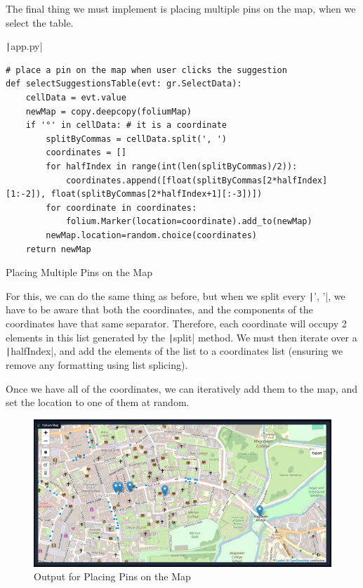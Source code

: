 \documentclass[12pt]{report}
\newcommand{\pil}[1]{\protect\texttt|#1|}
\begin{document}
The final thing we must implement is placing multiple pins on the map, when we select the table.

\begin{listing}[H]
\pil{app.py}
\begin{verbatim}
# place a pin on the map when user clicks the suggestion
def selectSuggestionsTable(evt: gr.SelectData):
    cellData = evt.value
    newMap = copy.deepcopy(foliumMap)
    if '°' in cellData: # it is a coordinate
        splitByCommas = cellData.split(', ')
        coordinates = []
        for halfIndex in range(int(len(splitByCommas)/2)):
            coordinates.append([float(splitByCommas[2*halfIndex][1:-2]), float(splitByCommas[2*halfIndex+1][:-3])])
        for coordinate in coordinates:
            folium.Marker(location=coordinate).add_to(newMap)
        newMap.location=random.choice(coordinates)
    return newMap
\end{verbatim}
\caption{Placing Multiple Pins on the Map}\label{cs:placeMultiplePins}
\end{listing}

For this, we can do the same thing as before, but when we split every \pil{', '}, we have to be aware that both the coordinates, and the components of the coordinates have that same separator. Therefore, each coordinate will occupy 2 elements in this list generated by the \pil{split} method. We must then iterate over a \pil{halfIndex}, and add the elements of the list to a coordinates list (ensuring we remove any formatting using list splicing).

Once we have all of the coordinates, we can iteratively add them to the map, and set the location to one of them at random.

\begin{figure}[H]
\centering
\includegraphics[width=14cm]{ss21.5.png}
\caption{Output for Placing Pins on the Map}\label{fig:ss21.5}
\end{figure}
\end{document}

